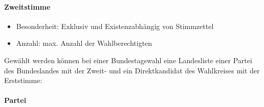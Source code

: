 \documentclass[a4paper]{article}
\begin{document}
\paragraph{Zweitstimme}
\begin{itemize}
\item Besonderheit: Exklusiv und Existenzabhängig von Stimmzettel
\item Anzahl: max. Anzahl der Wahlberechtigten
\end{itemize}

Gewählt werden können bei einer Bundestagswahl eine Landesliste einer Partei des Bundeslandes mit der Zweit- und ein Direktkandidat des Wahlkreises mit der Erststimme:

\paragraph{Partei}
\end{document}
